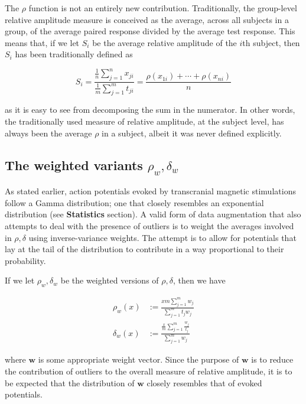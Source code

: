 \documentclass{article}
\begin{document}
\begin{multicols}{2}
The $\rho$ function is not an entirely new contribution. Traditionally, the
group-level relative amplitude measure is conceived as the average, across all
subjects in a group, of the average paired response divided by the average test
response. This means that, if we let $S_i$ be the average relative amplitude of
the $i$th subject, then $S_i$ has been traditionally defined as

\begin{equation} 
    S_i=\frac{\frac{1}{n}\sum_{j=1}^n x_{ji}}{\frac{1}{m}\sum_{j=1}^m t_{ji}} = 
    \frac{\rho(x_{1i})+\cdots + \rho(x_{ni})}{n} 
\end{equation}

as it is easy to see from decomposing the sum in the
numerator. In other words, the traditionally used measure of
relative amplitude, at the subject level, has always been
the average $\rho$ in a subject, albeit it was never defined explicitly.

\subsection{The weighted variants $\rho_w, \delta_w$}

As stated earlier, action potentials evoked by transcranial
magnetic stimulations follow a Gamma distribution; one that
closely resembles an exponential distribution (see
\textbf{Statistics} section). A valid form of data
augmentation that also attempts to deal with the presence of
outliers is to weight the averages involved in $\rho,
\delta$ using inverse-variance weights. The attempt is to
allow for potentials that lay at the tail of the
distribution to contribute in a way proportional to their
probability. 

If we let $\rho_w, \delta_w$ be the weighted versions of
$\rho, \delta$, then we have 

        \begin{align} \rho_w(x) &:= \frac{xm\sum_{j=1}^m
        w_j}{\sum_{j=1}^m t_j w_j} \\ \delta_w(x) &:=
    \frac{\frac{x}{m}\sum_{j=1}^m\frac{w_j}{t_j}}{\sum_{j=1}^m
w_j} \end{align}

where $\textbf{w}$ is some appropriate weight vector. Since
the purpose of $\textbf{w}$ is to reduce the contribution of
outliers to the overall measure of relative amplitude, it is
to be expected that the distribution of $\textbf{w}$ closely
resembles that of evoked potentials.


\end{multicols}
\end{document}
